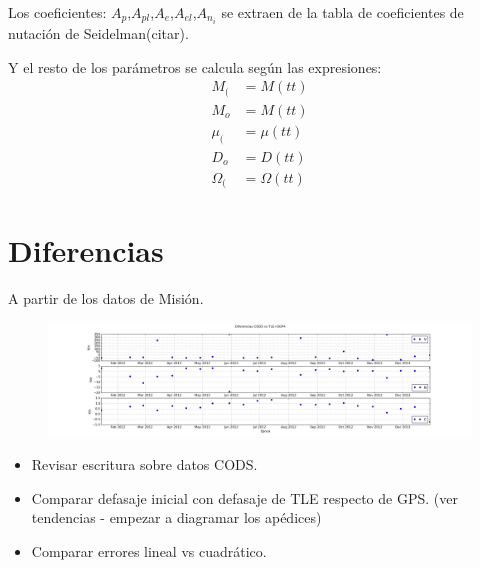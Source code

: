 Los coeficientes: $A_{p}$,$A_{pl}$,$A_{e}$,$A_{el}$,$A_{n_{i}}$ se extraen de la tabla de coeficientes de nutaci\'on de Seidelman(citar).

Y el resto de los par\'ametros se calcula seg\'un las expresiones:\\

\begin{align*}
 M_{(} & = M(tt)\\
 M_{o} & = M(tt)\\
 \mu_{(} &= \mu(tt)\\
 D_{o} &= D(tt)\\
 \Omega_{(} &= \Omega(tt)
\end{align*}

\section{Diferencias}
A partir de los datos de Misión. 

\begin{figure}[!h]
  \centering
  \includegraphics[width=\textwidth]{imagenes/sesgoTLE}
\end{figure}

\begin{itemize}
 \item Revisar escritura sobre datos CODS.
 \item Comparar defasaje inicial con defasaje de TLE respecto de GPS. (ver tendencias - empezar a diagramar los apédices)
 \item Comparar errores lineal vs cuadr\'atico.
\end{itemize}
